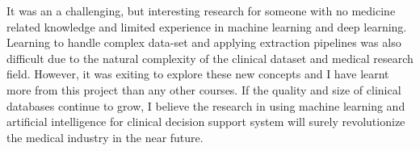 \documentclass{l4proj}
\begin{document}
It was an a challenging, but interesting research for someone with no medicine related knowledge and limited experience in machine learning and deep learning. Learning to handle complex data-set and applying extraction pipelines was also difficult due to the natural complexity of the clinical dataset and medical research field. However, it was exiting to explore these new concepts and I have learnt more from this project than any other courses. If the quality and size of clinical databases continue to grow, I believe the research in using machine learning and artificial intelligence for clinical decision support system will surely revolutionize the medical industry in the near future.



%
% 
\end{document}
